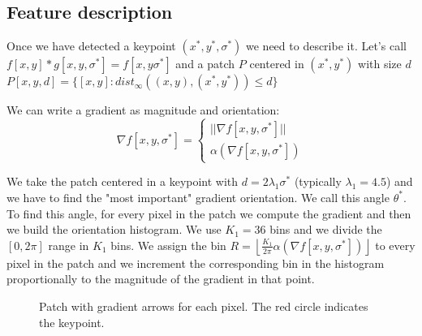 \subsection{Feature description}
\label{sec:feature_description}

Once we have detected a keypoint $(x^*,y^*,\sigma^*)$ we need to describe it.
Let's call $f[x,y]*g[x,y,\sigma^*]=f[x,y\sigma^*]$ and a patch $P$ centered in $(x^*,y^*)$ with size $d$
$P[x,y,d]=\{[x,y]:dist_\infty((x,y),(x^*,y^*))\le d\}$

We can write a gradient as magnitude and orientation:
\[
    \nabla f[x,y,\sigma^*]=\begin{cases}
        ||\nabla f[x,y,\sigma^*]|| \\
        \alpha(\nabla f[x,y,\sigma^*])
    \end{cases}
\]

We take the patch centered in a keypoint with $d=2\lambda_1\sigma^*$ (typically $\lambda_1=4.5$)
and we have to find the "most important" gradient orientation.
We call this angle $\theta^*$.
To find this angle, for every pixel in the patch we compute the gradient and then
we build the orientation histogram.
We use $K_1=36$ bins and we divide the $[0,2\pi]$ range in $K_1$ bins.
We assign the bin $R=\left\lfloor \frac{K_1}{2\pi} \alpha(\nabla f[x,y,\sigma^*]) \right\rfloor$
to every pixel in the patch and we increment the corresponding bin in the histogram proportionally
to the magnitude of the gradient in that point.

\begin{figure}[H]
    \centering
    \caption{Patch with gradient arrows for each pixel. The red circle indicates the keypoint.}
    \label{fig:patch_gradients}
\end{figure}

